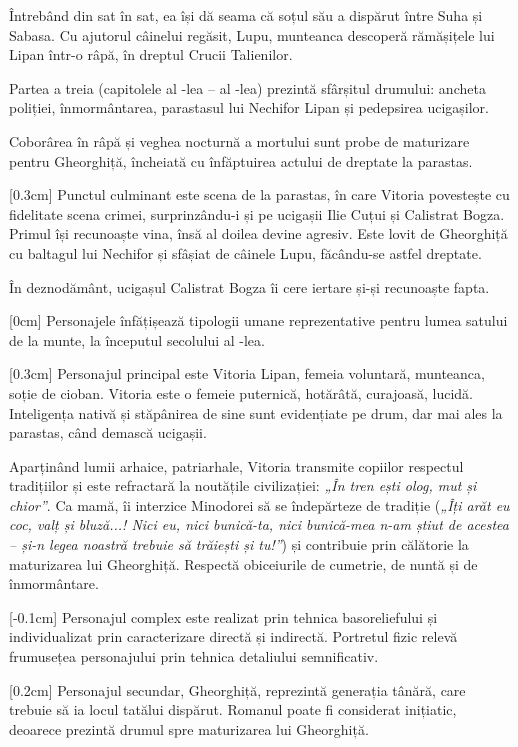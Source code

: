 Întrebând din sat în sat, ea își dă seama că soțul său a dispărut între Suha și Sabasa. Cu ajutorul câinelui regăsit, Lupu, munteanca descoperă rămășițele lui Lipan într-o râpă, în dreptul Crucii Talienilor.

Partea a treia (capitolele al -lea -- al -lea) prezintă sfârșitul drumului: ancheta poliției, înmormântarea, parastasul lui Nechifor Lipan și pedepsirea ucigașilor.

Coborârea în râpă și veghea nocturnă a mortului sunt probe de maturizare pentru Gheorghiță, încheiată cu înfăptuirea actului de dreptate la parastas.

[0.3cm]
Punctul culminant este scena de la parastas, în care Vitoria povestește cu fidelitate scena crimei, surprinzându-i și pe ucigașii Ilie Cuțui și Calistrat Bogza. Primul își recunoaște vina, însă al doilea devine agresiv. Este lovit de Gheorghiță cu baltagul lui Nechifor și sfâșiat de câinele Lupu, făcându-se astfel dreptate.

În deznodământ, ucigașul Calistrat Bogza îi cere iertare și-și recunoaște fapta.

[0cm]
Personajele înfățișează tipologii umane reprezentative pentru lumea satului de la munte, la începutul secolului al -lea.

[0.3cm]
Personajul principal este Vitoria Lipan, femeia voluntară, munteanca, soție de cioban. Vitoria este o femeie puternică, hotărâtă, curajoasă, lucidă. Inteligența nativă și stăpânirea de sine sunt evidențiate pe drum, dar mai ales la parastas, când demască ucigașii.

Aparținând lumii arhaice, patriarhale, Vitoria transmite copiilor respectul tradițiilor și este refractară la noutățile civilizației: \textit{„În tren ești olog, mut și chior”}. Ca mamă, îi interzice Minodorei să se îndepărteze de tradiție (\textit{„Îți arăt eu coc, valț și bluză...! Nici eu, nici bunică-ta, nici bunică-mea n-am știut de acestea -- și-n legea noastră trebuie să trăiești și tu!”}) și contribuie prin călătorie la maturizarea lui Gheorghiță. Respectă obiceiurile de cumetrie, de nuntă și de înmormântare.

[-0.1cm]
Personajul complex este realizat prin tehnica basoreliefului și individualizat prin caracterizare directă și indirectă. Portretul fizic relevă frumusețea personajului prin tehnica detaliului semnificativ.

[0.2cm]
Personajul secundar, Gheorghiță, reprezintă generația tânără, care trebuie să ia locul tatălui dispărut. Romanul poate fi considerat inițiatic, deoarece prezintă drumul spre maturizarea lui Gheorghiță.

